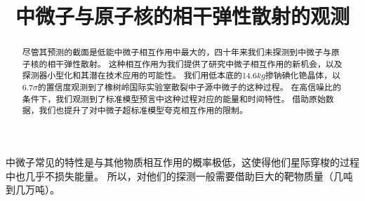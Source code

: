 
\begin{translation}
\label{cha:translation}

\title{中微子与原子核的相干弹性散射的观测}
\maketitle

\tableofcontents

\begin{abstract}
  尽管其预测的截面是低能中微子相互作用中最大的，四十年来我们未探测到中微子与原子核的相干弹性散射。
  这种相互作用为我们提供了研究中微子相互作用的新机会，以及探测器小型化和其潜在技术应用的可能性。
  我们用低本底的14.6$\si{kg}$掺钠碘化铯晶体，以6.7$\sigma$的置信度观测到了橡树岭国际实验室散裂中子源中微子的这种过程。
  在高信噪比的条件下，我们观测到了标准模型预言中这种过程对应的能量和时间特性。
  借助原始数据，我们也提升了对中微子超标准模型夸克相互作用的限制。
\end{abstract}

中微子常见的特性是与其他物质相互作用的概率极低，这使得他们星际穿梭的过程中也几乎不损失能量。
所以，对他们的探测一般需要借助巨大的靶物质量（几吨到几万吨）。




\begin{translation-index}
  \nocite{akimov_observation_2017}
  
  
\end{translation-index}

\end{translation}
